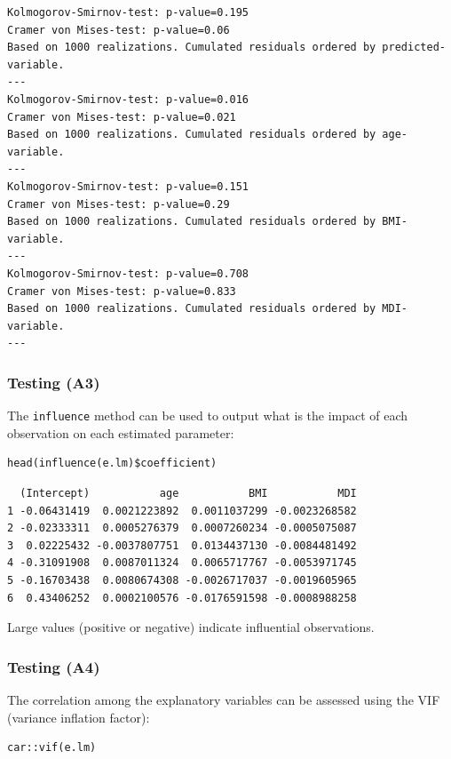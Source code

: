 \documentclass{article}
\begin{document}
\begin{verbatim}
Kolmogorov-Smirnov-test: p-value=0.195
Cramer von Mises-test: p-value=0.06
Based on 1000 realizations. Cumulated residuals ordered by predicted-variable.
---
Kolmogorov-Smirnov-test: p-value=0.016
Cramer von Mises-test: p-value=0.021
Based on 1000 realizations. Cumulated residuals ordered by age-variable.
---
Kolmogorov-Smirnov-test: p-value=0.151
Cramer von Mises-test: p-value=0.29
Based on 1000 realizations. Cumulated residuals ordered by BMI-variable.
---
Kolmogorov-Smirnov-test: p-value=0.708
Cramer von Mises-test: p-value=0.833
Based on 1000 realizations. Cumulated residuals ordered by MDI-variable.
---
\end{verbatim}

\subsubsection{Testing (A3)}
\label{sec:org00ff818}

The \texttt{influence} method can be used to output what is the impact of
each observation on each estimated parameter:
\lstset{language=r,label= ,caption= ,captionpos=b,numbers=none}
\begin{lstlisting}
head(influence(e.lm)$coefficient)
\end{lstlisting}

\begin{verbatim}
  (Intercept)           age           BMI           MDI
1 -0.06431419  0.0021223892  0.0011037299 -0.0023268582
2 -0.02333311  0.0005276379  0.0007260234 -0.0005075087
3  0.02225432 -0.0037807751  0.0134437130 -0.0084481492
4 -0.31091908  0.0087011324  0.0065717767 -0.0053971745
5 -0.16703438  0.0080674308 -0.0026717037 -0.0019605965
6  0.43406252  0.0002100576 -0.0176591598 -0.0008988258
\end{verbatim}

Large values (positive or negative) indicate influential observations.

\subsubsection{Testing (A4)}
\label{sec:org6e5096c}

The correlation among the explanatory variables can be assessed using
the VIF (variance inflation factor):
\lstset{language=r,label= ,caption= ,captionpos=b,numbers=none}
\begin{lstlisting}
car::vif(e.lm)
\end{lstlisting}
\end{document}
